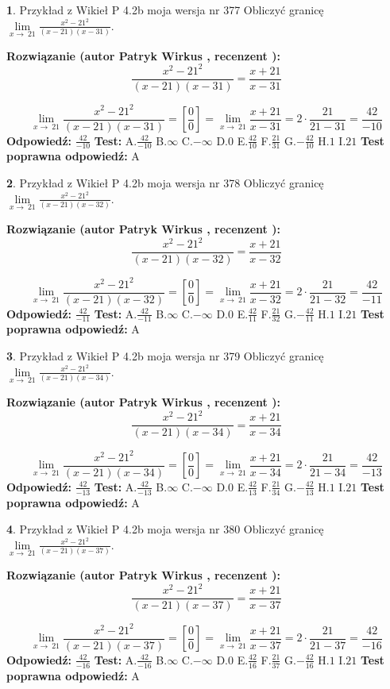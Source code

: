 \documentclass[12pt, a4paper]{article}
\theoremstyle{definition} %
\newtheorem{zad}{}
\newcommand{\zadStart}[1]{\begin{zad}#1\newline}
\newcommand{\zadStop}{\end{zad}}
\newcommand{\rozwStart}[2]{\noindent \textbf{Rozwiązanie (autor #1 , recenzent #2): }\newline}
\newcommand{\rozwStop}{\newline}
\newcommand{\odpStart}{\noindent \textbf{Odpowiedź:}\newline}
\newcommand{\odpStop}{\newline}
\newcommand{\testStart}{\noindent \textbf{Test:}\newline}
\newcommand{\testStop}{\newline}
\newcommand{\kluczStart}{\noindent \textbf{Test poprawna odpowiedź:}\newline}
\newcommand{\kluczStop}{\newline}
\begin{document}
\zadStart{Przykład z Wikieł P 4.2b moja wersja nr 377}
Obliczyć granicę $\lim\limits_{x\to\ 21}\frac{x^{2}-21^{2}}{(x-21)(x-31)}$.
\zadStop
\rozwStart{Patryk Wirkus}{}
$$\frac{x^{2}-21^{2}}{(x-21)(x-31)}=\frac{x+21}{x-31}$$

$$\lim\limits_{x\to\ 21}\frac{x^{2}-21^{2}}{(x-21)(x-31)}=[\frac{0}{0}]=\lim\limits_{x\to\ 21}\frac{x+21}{x-31}=2 \cdot \frac{21}{21-31} = \frac{42}{-10}$$
\rozwStop
\odpStart
$\frac{42}{-10}$
\odpStop
\testStart
A.$\frac{42}{-10}$
B.$\infty$
C.$-\infty$
D.$0$
E.$\frac{42}{10}$
F.$\frac{21}{31}$
G.$-\frac{42}{10}$
H.$1$
I.$21$
\testStop
\kluczStart
A
\kluczStop



\zadStart{Przykład z Wikieł P 4.2b moja wersja nr 378}
Obliczyć granicę $\lim\limits_{x\to\ 21}\frac{x^{2}-21^{2}}{(x-21)(x-32)}$.
\zadStop
\rozwStart{Patryk Wirkus}{}
$$\frac{x^{2}-21^{2}}{(x-21)(x-32)}=\frac{x+21}{x-32}$$

$$\lim\limits_{x\to\ 21}\frac{x^{2}-21^{2}}{(x-21)(x-32)}=[\frac{0}{0}]=\lim\limits_{x\to\ 21}\frac{x+21}{x-32}=2 \cdot \frac{21}{21-32} = \frac{42}{-11}$$
\rozwStop
\odpStart
$\frac{42}{-11}$
\odpStop
\testStart
A.$\frac{42}{-11}$
B.$\infty$
C.$-\infty$
D.$0$
E.$\frac{42}{11}$
F.$\frac{21}{32}$
G.$-\frac{42}{11}$
H.$1$
I.$21$
\testStop
\kluczStart
A
\kluczStop



\zadStart{Przykład z Wikieł P 4.2b moja wersja nr 379}
Obliczyć granicę $\lim\limits_{x\to\ 21}\frac{x^{2}-21^{2}}{(x-21)(x-34)}$.
\zadStop
\rozwStart{Patryk Wirkus}{}
$$\frac{x^{2}-21^{2}}{(x-21)(x-34)}=\frac{x+21}{x-34}$$

$$\lim\limits_{x\to\ 21}\frac{x^{2}-21^{2}}{(x-21)(x-34)}=[\frac{0}{0}]=\lim\limits_{x\to\ 21}\frac{x+21}{x-34}=2 \cdot \frac{21}{21-34} = \frac{42}{-13}$$
\rozwStop
\odpStart
$\frac{42}{-13}$
\odpStop
\testStart
A.$\frac{42}{-13}$
B.$\infty$
C.$-\infty$
D.$0$
E.$\frac{42}{13}$
F.$\frac{21}{34}$
G.$-\frac{42}{13}$
H.$1$
I.$21$
\testStop
\kluczStart
A
\kluczStop



\zadStart{Przykład z Wikieł P 4.2b moja wersja nr 380}
Obliczyć granicę $\lim\limits_{x\to\ 21}\frac{x^{2}-21^{2}}{(x-21)(x-37)}$.
\zadStop
\rozwStart{Patryk Wirkus}{}
$$\frac{x^{2}-21^{2}}{(x-21)(x-37)}=\frac{x+21}{x-37}$$

$$\lim\limits_{x\to\ 21}\frac{x^{2}-21^{2}}{(x-21)(x-37)}=[\frac{0}{0}]=\lim\limits_{x\to\ 21}\frac{x+21}{x-37}=2 \cdot \frac{21}{21-37} = \frac{42}{-16}$$
\rozwStop
\odpStart
$\frac{42}{-16}$
\odpStop
\testStart
A.$\frac{42}{-16}$
B.$\infty$
C.$-\infty$
D.$0$
E.$\frac{42}{16}$
F.$\frac{21}{37}$
G.$-\frac{42}{16}$
H.$1$
I.$21$
\testStop
\kluczStart
A
\kluczStop
\end{document}

